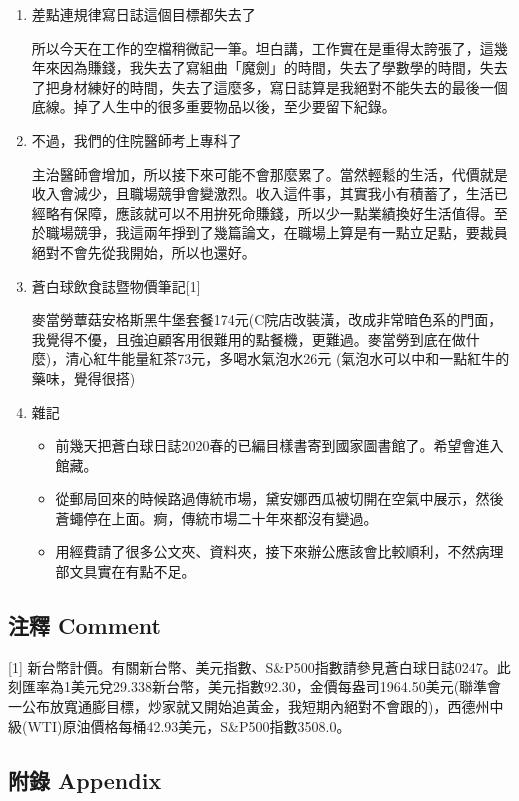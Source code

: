 \documentclass[a5paper, 11pt
]{book}
\providecommand{\tightlist}{%
  \setlength{\itemsep}{0pt}\setlength{\parskip}{0pt}}
\begin{document}
\begin{enumerate}
\def\labelenumi{\arabic{enumi}.}
\item
  差點連規律寫日誌這個目標都失去了

  所以今天在工作的空檔稍微記一筆。坦白講，工作實在是重得太誇張了，這幾年來因為賺錢，我失去了寫組曲「魔劍」的時間，失去了學數學的時間，失去了把身材練好的時間，失去了這麼多，寫日誌算是我絕對不能失去的最後一個底線。掉了人生中的很多重要物品以後，至少要留下紀錄。
\item
  不過，我們的住院醫師考上專科了

  主治醫師會增加，所以接下來可能不會那麼累了。當然輕鬆的生活，代價就是收入會減少，且職場競爭會變激烈。收入這件事，其實我小有積蓄了，生活已經略有保障，應該就可以不用拚死命賺錢，所以少一點業績換好生活值得。至於職場競爭，我這兩年掙到了幾篇論文，在職場上算是有一點立足點，要裁員絕對不會先從我開始，所以也還好。
\item
  蒼白球飲食誌暨物價筆記{[}1{]}

  麥當勞蕈菇安格斯黑牛堡套餐174元(C院店改裝潢，改成非常暗色系的門面，我覺得不優，且強迫顧客用很難用的點餐機，更難過。麥當勞到底在做什麼)，清心紅牛能量紅茶73元，多喝水氣泡水26元
  (氣泡水可以中和一點紅牛的藥味，覺得很搭)
\item
  雜記

  \begin{itemize}
  \tightlist
  \item
    前幾天把蒼白球日誌2020春的已編目樣書寄到國家圖書館了。希望會進入館藏。
  \item
    從郵局回來的時候路過傳統市場，黛安娜西瓜被切開在空氣中展示，然後蒼蠅停在上面。痾，傳統市場二十年來都沒有變過。
  \item
    用經費請了很多公文夾、資料夾，接下來辦公應該會比較順利，不然病理部文具實在有點不足。
  \end{itemize}
\end{enumerate}

\hypertarget{ux6ce8ux91cb-comment-90}{%
\subsection{注釋 Comment}\label{ux6ce8ux91cb-comment-90}}

{[}1{]}
新台幣計價。有關新台幣、美元指數、S\&P500指數請參見蒼白球日誌0247。此刻匯率為1美元兌29.338新台幣，美元指數92.30，金價每盎司1964.50美元(聯準會一公布放寬通膨目標，炒家就又開始追黃金，我短期內絕對不會跟的)，西德州中級(WTI)原油價格每桶42.93美元，S\&P500指數3508.0。

\hypertarget{ux9644ux9304-appendix-90}{%
\subsection{附錄 Appendix}\label{ux9644ux9304-appendix-90}}
\end{document}
